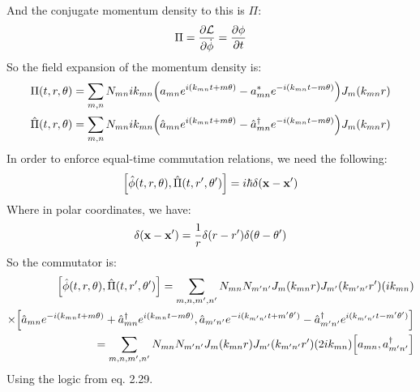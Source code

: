 \documentclass[12pt]{article}
\renewcommand{\L}{\mathcal{L}}
\begin{document}
And the conjugate momentum density to this is $\Pi$:
\begin{align*}
  \Pi=\pdv{\L}{\dot{\phi}}=\pdv{\phi}{t}
\end{align*}
So the field expansion of the momentum density is:
\begin{align*}
  \Pi(t,r,\theta)&=\sum_{m,n}N_{mn}ik_{mn}\qty(
  a_{mn}e^{i(k_{mn}t+m\theta)}-a^*_{mn}e^{-i(k_{mn}t-m\theta)})J_m(k_{mn}r)\\
  \hat\Pi(t,r,\theta)&=\sum_{m,n}N_{mn}ik_{mn}\qty(
  \hat{a}_{mn}e^{i(k_{mn}t+m\theta)}-\hat{a}^\dag_{mn}e^{-i(k_{mn}t-m\theta)})
  J_m(k_{mn}r)
\end{align*}
In order to enforce equal-time commutation relations, we need the following:
\begin{align*}
  \comm{\hat\phi(t,r,\theta)}{\hat\Pi(t,r',\theta')}=i\hbar\delta(\vb{x-x}')
\end{align*}
Where in polar coordinates, we have:
\begin{align*}
  \delta(\vb{x-x}')=\frac1r\delta(r-r')\delta(\theta-\theta')
\end{align*}
So the commutator is:
\begin{align*}
  \comm{\hat\phi(t,r,\theta)}{\hat\Pi(t,r',\theta')}
  =\sum_{m,n,m',n'}N_{mn}N_{m'n'}J_{m}(k_{mn}r)J_{m'}(k_{m'n'}r')(ik_{mn})\\
  \times\comm
  {\hat{a}_{mn}e^{-i(k_{mn}t+m\theta)}
    +\hat{a}^\dag_{mn}e^{i(k_{mn}t-m\theta)}}
  {\hat{a}_{m'n'}e^{-i(k_{m'n'}t+m'\theta')}
    -\hat{a}^\dag_{m'n'}e^{i(k_{m'n'}t-m'\theta')}}\\
  =\sum_{m,n,m',n'}N_{mn}N_{m'n'}J_{m}(k_{mn}r)J_{m'}(k_{m'n'}r')(2ik_{mn})
  \comm{a_{mn}}{a_{m'n'}^\dag}
\end{align*}
Using the logic from eq. 2.29.
\end{document}
